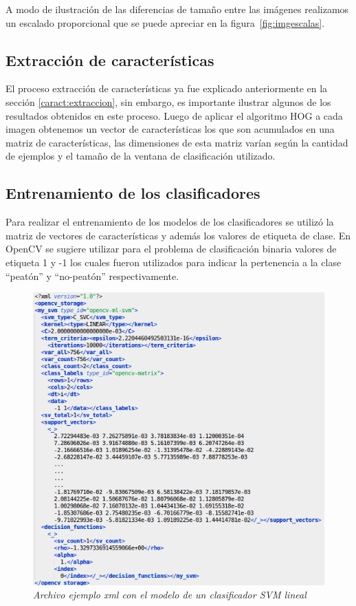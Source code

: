 A modo de ilustración de las diferencias de tamaño entre las imágenes realizamos un escalado proporcional que se puede apreciar en la figura~\ref{fig:imgescalas}.

\subsection{Extracción de características}

El proceso extracción de características ya fue explicado anteriormente en la sección \ref{caract:extraccion}, sin embargo, es importante ilustrar algunos de los resultados obtenidos en este proceso. Luego de aplicar el algoritmo HOG a cada imagen obtenemos un vector de características los que son acumulados en una matriz de características, las dimensiones de esta matriz varían según la cantidad de ejemplos y el tamaño de la ventana de clasificación utilizado.

\subsection{Entrenamiento de los clasificadores}

Para realizar el entrenamiento de los modelos de los clasificadores se utilizó la matriz de vectores de características y además los valores de etiqueta de clase. En OpenCV se sugiere utilizar para el problema de clasificación binaria valores de etiqueta 1 y -1 los cuales fueron utilizados para indicar la pertenencia a la clase ``peatón'' y ``no-peatón'' respectivamente. 

\begin{figure}[H]
  \centering
  \includegraphics[scale=.6]{images/modelo}
  \caption{\em Archivo ejemplo xml con el modelo de un clasificador SVM lineal }  
  \label{fig:ejmodelo}
\end{figure}


